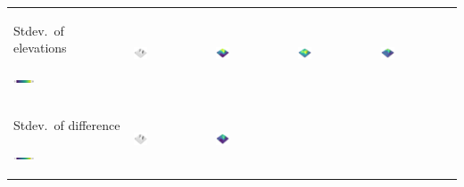\documentclass[prodmode,acmtochi]{acmsmall} %
\begin{document}
\begin{table}
{\begin{tabular}{m{} m{} m{} m{} m{}}
%
Stdev.~of elevations \par \vspace{0.5em} \includegraphics[width=0.19\textwidth]{images/legends/stdev_legend.pdf} & 
\includegraphics[width=0.19\textwidth]{images/render_3d/dem_difference_1.png} &
\includegraphics[width=0.19\textwidth]{images/render_3d/stdev_dem_1.png} &
\includegraphics[width=0.19\textwidth]{images/render_3d/stdev_dem_2.png} &
\includegraphics[width=0.19\textwidth]{images/render_3d/stdev_dem_3.png}\\
%
Stdev.~of difference \par \vspace{0.5em} \includegraphics[width=0.19\textwidth]{images/legends/stdev_diff_legend.pdf} & 
\includegraphics[width=0.19\textwidth]{images/render_3d/dem_difference_1.png} &
\includegraphics[width=0.19\textwidth]{images/render_3d/stdev_regression_difference_series_1.png} &

\end{tabular}}
\end{table}
\end{document}
